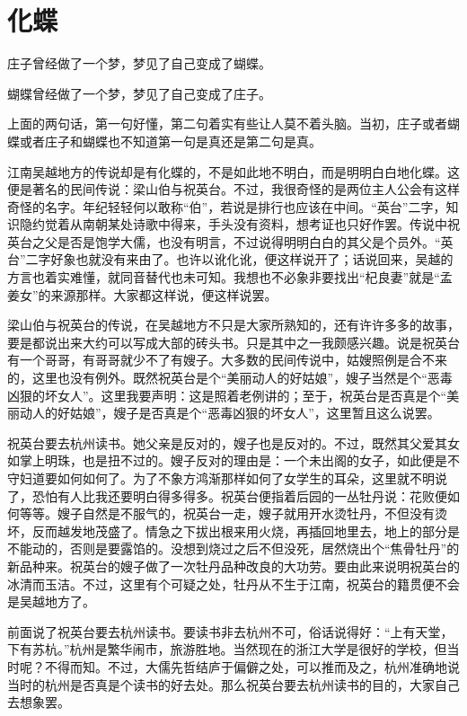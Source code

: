 \section{化蝶}
	
庄子曾经做了一个梦，梦见了自己变成了蝴蝶。
	
蝴蝶曾经做了一个梦，梦见了自己变成了庄子。
	
上面的两句话，第一句好懂，第二句着实有些让人莫不着头脑。当初，庄子或者蝴蝶或者庄子和蝴蝶也不知道第一句是真还是第二句是真。
	
江南吴越地方的传说却是有化蝶的，不是如此地不明白，而是明明白白地化蝶。这便是著名的民间传说：梁山伯与祝英台。不过，我很奇怪的是两位主人公会有这样奇怪的名字。年纪轻轻何以敢称“伯”，若说是排行也应该在中间。“英台”二字，知识隐约觉着从南朝某处诗歌中得来，手头没有资料，想考证也只好作罢。传说中祝英台之父是否是饱学大儒，也没有明言，不过说得明明白白的其父是个员外。“英台”二字好象也就没有来由了。也许以讹化讹，便这样说开了；话说回来，吴越的方言也着实难懂，就同音替代也未可知。我想也不必象非要找出“杞良妻”就是“孟姜女”的来源那样。大家都这样说，便这样说罢。
	
梁山伯与祝英台的传说，在吴越地方不只是大家所熟知的，还有许许多多的故事，要是都说出来大约可以写成大部的砖头书。只是其中之一我颇感兴趣。说是祝英台有一个哥哥，有哥哥就少不了有嫂子。大多数的民间传说中，姑嫂照例是合不来的，这里也没有例外。既然祝英台是个“美丽动人的好姑娘”，嫂子当然是个“恶毒凶狠的坏女人”。这里我要声明：这是照着老例讲的；至于，祝英台是否真是个“美丽动人的好姑娘”，嫂子是否真是个“恶毒凶狠的坏女人”，这里暂且这么说罢。
	
祝英台要去杭州读书。她父亲是反对的，嫂子也是反对的。不过，既然其父爱其女如掌上明珠，也是扭不过的。嫂子反对的理由是：一个未出阁的女子，如此便是不守妇道要如何如何了。为了不象方鸿渐那样如何了女学生的耳朵，这里就不明说了，恐怕有人比我还要明白得多得多。祝英台便指着后园的一丛牡丹说：花败便如何等等。嫂子自然是不服气的，祝英台一走，嫂子就用开水烫牡丹，不但没有烫坏，反而越发地茂盛了。情急之下拔出根来用火烧，再插回地里去，地上的部分是不能动的，否则是要露馅的。没想到烧过之后不但没死，居然烧出个“焦骨牡丹”的新品种来。祝英台的嫂子做了一次牡丹品种改良的大功劳。要由此来说明祝英台的冰清而玉洁。不过，这里有个可疑之处，牡丹从不生于江南，祝英台的籍贯便不会是吴越地方了。
	
前面说了祝英台要去杭州读书。要读书非去杭州不可，俗话说得好：“上有天堂，下有苏杭。”杭州是繁华闹市，旅游胜地。当然现在的浙江大学是很好的学校，但当时呢？不得而知。不过，大儒先哲结庐于偏僻之处，可以推而及之，杭州准确地说当时的杭州是否真是个读书的好去处。那么祝英台要去杭州读书的目的，大家自己去想象罢。
	
